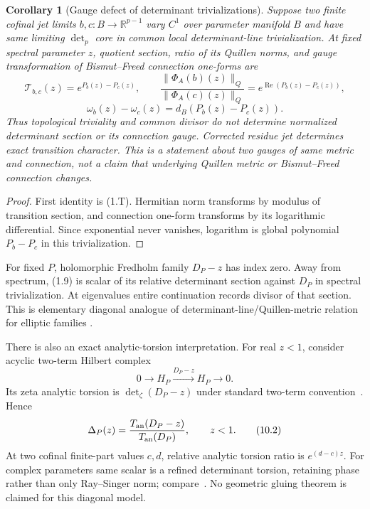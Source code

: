 \documentclass[11pt]{article}
\newtheorem{corollary}[theorem]{Corollary}
\theoremstyle{definition}
\theoremstyle{remark}
\newcommand{\R}{\mathbb R}
\begin{document}
\begin{corollary}[Gauge defect of determinant trivializations]
\label{cor:metric-connection}
Suppose two finite cofinal jet limits $b,c:B\to\R^{p-1}$ vary $C^1$ over parameter manifold $B$
and have same limiting $\det_p$ core in common local determinant-line trivialization.  At fixed
spectral parameter $z$, quotient section, ratio of its Quillen norms, and gauge transformation
of Bismut--Freed connection one-forms are
\[
 \mathcal T_{b,c}(z)=e^{P_b(z)-P_c(z)},\qquad
 \frac{\|\Phi_A(b)(z)\|_Q}{\|\Phi_A(c)(z)\|_Q}
   =e^{\operatorname{Re}(P_b(z)-P_c(z))},
\]
\[
 \omega_b(z)-\omega_c(z)=d_B(P_b(z)-P_c(z)).             \tag{10.M}
\]
Thus topological triviality and common divisor do not determine normalized determinant section
or its connection gauge.  Corrected residue jet determines exact transition character.  This
is a statement about two gauges of same metric and connection, not a claim that underlying
Quillen metric or Bismut--Freed connection changes.
\end{corollary}

\begin{proof}
First identity is (1.T).  Hermitian norm transforms by modulus of transition section, and
connection one-form transforms by its logarithmic differential.  Since exponential never
vanishes, logarithm is global polynomial $P_b-P_c$ in this trivialization.
\end{proof}

For fixed $P$, holomorphic Fredholm family $D_P-z$ has index zero.  Away from spectrum, (1.9) is
scalar of its relative determinant section against $D_P$ in spectral trivialization.  At
eigenvalues entire continuation records divisor of that section.  This is elementary diagonal
analogue of determinant-line/Quillen-metric relation for elliptic families
\cite{Quillen1985,BismutFreed1986,Scott1999,Bunke2002}.

There is also an exact analytic-torsion interpretation.  For real $z<1$, consider acyclic
two-term Hilbert complex
\[
 0\longrightarrow H_P\xrightarrow{D_P-z}H_P\longrightarrow0.
\]
Its zeta analytic torsion is $\det_\zeta(D_P-z)$ under standard two-term
convention~\cite{RaySinger1971}.  Hence
\begin{equation}
 \Delta_P(z)=\frac{T_{\rm an}(D_P-z)}{T_{\rm an}(D_P)},\qquad z<1. \tag{10.2}
\end{equation}
At two cofinal finite-part values $c,d$, relative analytic torsion ratio is $e^{(d-c)z}$.  For
complex parameters same scalar is a refined determinant torsion, retaining phase rather than
only Ray--Singer norm; compare~\cite{DaiFreed1994,BravermanKappeler2007}.  No geometric gluing
theorem is claimed for this diagonal model.
\end{document}
